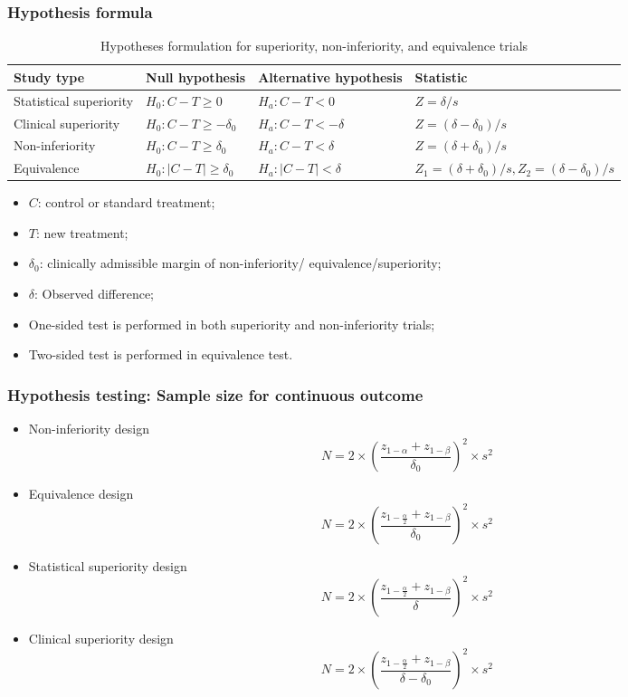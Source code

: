 \documentclass[table,10pt]{beamer}
\begin{document}
\begin{CJK*}{UTF8}{gbsn}
\begin{frame}[t]
\frametitle{Hypothesis formula}
\begin{table}
\footnotesize
\caption{Hypotheses formulation for superiority, non-inferiority, and equivalence trials}
\begin{tabular}{llll}
\hline
Study type & Null hypothesis & Alternative hypothesis & Statistic\\
\hline
Statistical superiority & $H_0: C - T \ge 0$ & $H_a: C - T < 0$ & $Z=\delta/s$\\
Clinical superiority & $H_0: C - T \ge -\delta_0$ & $H_a: C - T < -\delta$ & $Z=(\delta - \delta_0)/s$\\
Non-inferiority & $H_0: C - T \ge \delta_0$ & $H_a: C - T < \delta$ & $Z=(\delta + \delta_0)/s$\\
Equivalence & $H_0: |C - T| \ge \delta_0$ & $H_a: |C - T| < \delta$ & $Z_1 = (\delta+\delta_0)/s, Z_2=(\delta-\delta_0)/s$\\
\hline
\end{tabular}
\end{table}
\begin{itemize}
	\item $C$: control or standard treatment;
	\item $T$: new treatment;
	\item $\delta_0$: clinically admissible margin of non-inferiority/
		equivalence/superiority;
	\item $\delta$: Observed difference;
	\item One-sided test is performed in both superiority and non-inferiority 
		trials;
	\item Two-sided test is performed in equivalence test.
\end{itemize}
\end{frame}


\begin{frame}[t]
\frametitle{Hypothesis testing: Sample size for continuous outcome}
\begin{itemize}
	\item<2-> \alert{Non-inferiority design}
	$$
N = 2 \times \left( \frac{z_{1-\alpha} + z_{1-\beta}}{\delta_0} \right)^2 \times s^2
	$$
	\item<3-> \alert{Equivalence design}
	$$
N = 2 \times \left( \frac{z_{1-\frac{\alpha}{2}} + z_{1-\beta}}{\delta_0} \right)^2 \times s^2
	$$
	\item<4-> \alert{Statistical superiority design}
	$$
N = 2 \times \left( \frac{z_{1-\frac{\alpha}{2}} + z_{1-\beta}}{\delta} \right)^2 \times s^2
	$$
	\item<5-> \alert{Clinical superiority design}
	$$
	N = 2 \times \left( \frac{z_{1-\frac{\alpha}{2}} + z_{1-\beta}}{\delta - \delta_0} \right)^2 \times s^2
	$$
\end{itemize}
\end{frame}



\end{CJK*}
\end{document}

